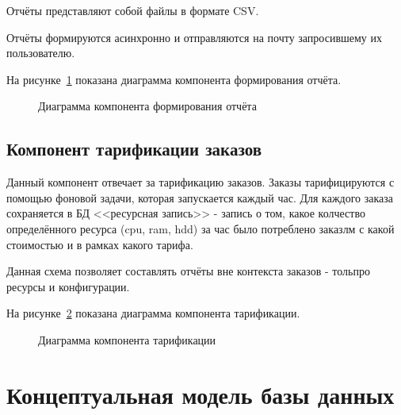 Отчёты представляют собой файлы в формате CSV.

Отчёты формируются асинхронно и отправляются на почту запросившему их пользователю.

На рисунке~\ref{fig:report_scheme} показана диаграмма компонента формирования отчёта.
\begin{figure}[ht]
  \caption{Диаграмма компонента формирования отчёта}\label{fig:report_scheme}
\end{figure}

\subsection{Компонент тарификации заказов}\label{sec:subs9}
Данный компонент отвечает за тарификацию заказов. Заказы тарифицируются с помощью фоновой задачи, которая запускается каждый час.
Для каждого заказа сохраняется в БД <<ресурсная запись>> - запись о том, какое колчество определённого ресурса (cpu, ram, hdd) за час было потреблено заказлм с какой стоимостью и в рамках какого тарифа.

Данная схема позволяет составлять отчёты вне контекста заказов - тольпро ресурсы и конфигурации.

На рисунке~\ref{fig:tarification_scheme} показана диаграмма компонента тарификации.
\begin{figure}[ht]
  \caption{Диаграмма компонента тарификации}\label{fig:tarification_scheme}
\end{figure}


\section{Концептуальная модель базы данных}\label{sec:ch4/sect2}




